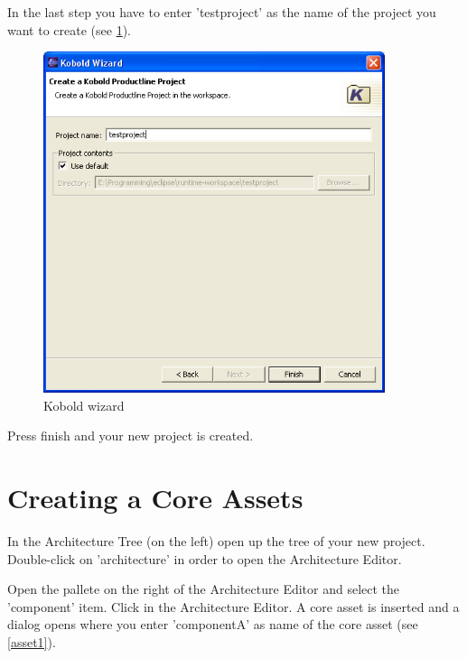 In the last step you have to enter 'testproject' as the name of the project you want to create (see \ref{project3}).

\begin{figure}[h!]
\begin{center}
\includegraphics[width=10cm]{tutorial6.png}
   \caption{Kobold wizard}
   \label{project3}
\end{center}
\end{figure}\par

Press finish and your new project is created.


\section{Creating a Core Assets}

In the Architecture Tree (on the left) open up the tree of your new project. Double-click on 'architecture' in order to 
open the Architecture Editor. \par

Open the pallete on the right of the Architecture Editor and select the 'component' item. Click in 
the Architecture Editor. A core asset is inserted and a dialog opens where you enter 'componentA' as name of
the core asset (see \ref{asset1}). 

